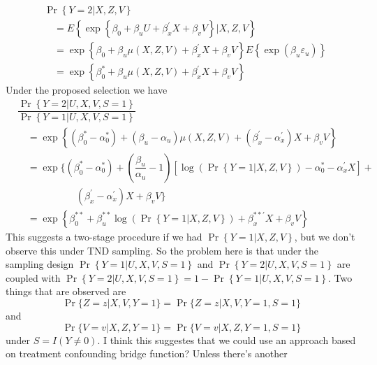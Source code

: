 \documentclass[12pt]{article}
\begin{document}
\begin{align*}
&\Pr \left\{ Y=2|X,Z,V\right\}  \\
&\quad=E\left\{ \exp \left\{ \beta _{0} + \beta
_{u}U+\beta _{x}^{\prime }X +\beta _{v}V\right\} |X,Z,V\right\}  \\
&\quad=\exp \left\{ \beta _{0} + \beta
_{u}\mu \left( X,Z,V \right)+\beta _{x}^{\prime }X +\beta _{v}V\right\} E\left\{ \exp \left( \beta _{u}\varepsilon
_{u}\right) \right\}  \\
&\quad=\exp \left\{ \beta^{\ast } _{0} + \beta
_{u}\mu \left( X,Z,V \right)+\beta _{x}^{\prime }X +\beta _{v}V\right\}  
\end{align*}%
Under the proposed selection we have
\begin{align*}
    &\dfrac{\Pr \left\{ Y=2|U,X,V,S=1\right\}}{\Pr \left\{ Y=1|U,X,V,S=1\right\}} \\
    &\quad=\exp \left\{ (\beta _{0}^{\ast } - \alpha_0^{\ast}) + (\beta _{u} - \alpha_u)\mu \left( X,Z,V \right)  +(\beta _{x}^{ \prime } - \alpha_x^{\prime}) X + \beta _{v}V\right\} \\
    &\quad=\exp \bigg\{ (\beta _{0}^{\ast } - \alpha_0^{\ast}) + \left(\dfrac{\beta _{u}}{\alpha_u} - 1\right)\left[ \log \left(\Pr \left\{ Y=1|X,Z,V\right\} \right) -\alpha _{0}^{\ast }-\alpha _{x}^{\prime }X\right] + \\
    &\qquad \qquad \qquad(\beta _{x}^{ \prime } - \alpha_x^{\prime}) X + \beta _{v}V\bigg\} \\
    &\quad=\exp\left\{ \beta _{0}^{\ast \ast } + \beta_u^{\ast \ast} \log \left(\Pr \left\{ Y=1|X,Z,V\right\} \right) + \beta _{x}^{ \ast \ast \prime } X + \beta _{v}V\right\} 
\end{align*}
This suggests a two-stage procedure if we had $\Pr\left\{ Y=1|X,Z,V\right\}$, but we don't observe this under TND sampling. So the problem here is that under the sampling design $\Pr \left\{ Y=1|U,X,V,S=1\right\}$ and $\Pr \left\{ Y=2|U,X,V,S=1\right\}$ are coupled with $\Pr \left\{ Y=2|U,X,V,S=1\right\} = 1 - \Pr \left\{ Y=1|U,X,V,S=1\right\}$. Two things that are observed are 
\[\Pr\{Z=z | X, V, Y = 1\} = \Pr\{Z=z | X, V, Y = 1, S = 1\}\]
and 
\[\Pr\{V=v | X, Z, Y = 1\} = \Pr\{V=v | X, Z, Y = 1, S =1\}\]
under $S = I(Y\neq0)$. I think this suggestes that we could use an approach based on treatment confounding bridge function? Unless there's another 
\end{document}
